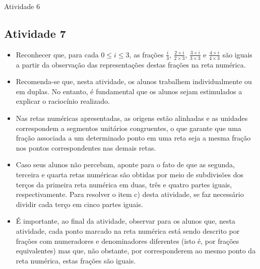 \begin{multicols}{2}
\begin{resposta*}{Atividade 6}
\end{resposta*}

\Bg

\subsection{Atividade 7}

\begin{itemize} %
    \item       Reconhecer que, para cada       $0 \leq i \leq 3$, as frações    
   $\frac{i}{3}$,       $\frac{2 \times i}{2 \times 3 }$,       $\frac{3 \times 
i}{3 \times 3}$       e       $\frac{4 \times i}{4 \times 3}$       são iguais a 
partir da observação das representações destas frações na reta numérica.
\end{itemize} %
  
  
 
\begin{itemize} %
    \item       Recomenda-se que, nesta atividade, os alunos trabalhem 
individualmente ou em duplas. No entanto, é fundamental que os alunos sejam 
estimulados a explicar o raciocínio realizado.
    \item       Nas retas numéricas apresentadas, as origens estão alinhadas e 
as unidades correspondem a segmentos unitários congruentes, o que garante que 
uma fração associada a um determinado ponto em uma reta seja a mesma fração nos 
pontos correspondentes nas demais retas.
    \item       Caso seus alunos não percebam, aponte para o fato de que as 
segunda, terceira e quarta retas numéricas são obtidas por meio de subdivisões 
dos terços da primeira reta numérica em duas, três e quatro partes iguais, 
respectivamente. Para resolver o item c) desta atividade, se faz necessário 
dividir cada terço em cinco partes iguais.
    \item       É importante, ao final da atividade, observar para os alunos 
que, nesta atividade, cada ponto marcado na reta numérica está sendo descrito 
por frações com numeradores e denominadores diferentes (isto é, por frações 
equivalentes) mas que, não obstante, por corresponderem ao mesmo ponto da reta 
numérica, estas frações são iguais.
\end{itemize} %
  
  
   \vspace{.1cm}
  

\end{multicols}
